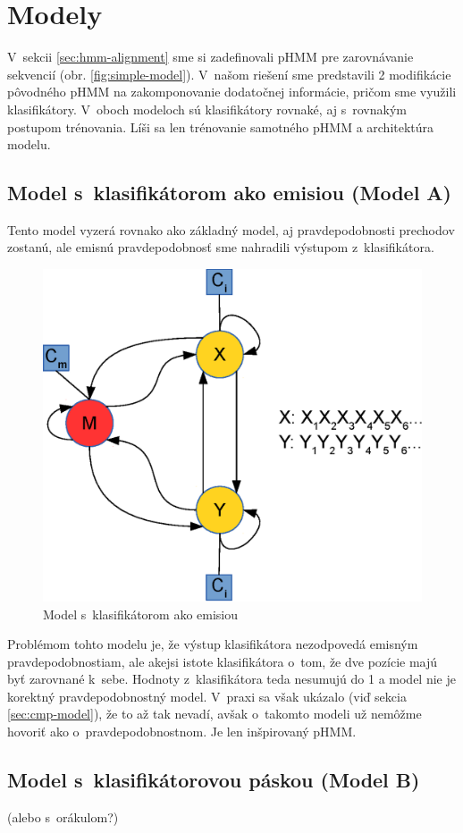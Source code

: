 \chapter{Modely}
\label{chap:models}

V~sekcii \ref{sec:hmm-alignment} sme si zadefinovali pHMM pre zarovnávanie sekvencií (obr. \ref{fig:simple-model}).
V~našom riešení sme predstavili 2 modifikácie pôvodného pHMM na zakomponovanie dodatočnej informácie, pričom sme využili klasifikátory. V~oboch modeloch sú klasifikátory rovnaké, aj s~rovnakým postupom trénovania. Líši sa len trénovanie samotného pHMM a architektúra modelu.

\section[Model s~klasifikátorom ako emisiou]{Model s~klasifikátorom ako emisiou (Model A)}
\label{sec:model-clf}

Tento model vyzerá rovnako ako základný model, aj pravdepodobnosti prechodov zostanú, ale emisnú pravdepodobnosť sme nahradili výstupom z~klasifikátora.

\begin{figure}[htp]
    \centering
    \includegraphics[width=.5\textwidth]{images/model_clf}
    \caption{Model s~klasifikátorom ako emisiou}
\end{figure}

Problémom tohto modelu je, že výstup klasifikátora nezodpovedá emisným pravdepodobnostiam, ale akejsi istote klasifikátora o~tom, že dve pozície majú byť zarovnané k~sebe. Hodnoty z~klasifikátora teda nesumujú do 1 a model nie je korektný pravdepodobnostný model. V~praxi sa však ukázalo (viď sekcia \ref{sec:cmp-model}), že to až tak nevadí, avšak o~takomto modeli už nemôžme hovoriť ako o~pravdepodobnostnom. Je len inšpirovaný pHMM.

\section[Model s~klasifikátorovou páskou]{Model s~klasifikátorovou páskou (Model B)}
\label{sec:model-tape}
(\todo alebo s~orákulom?)

